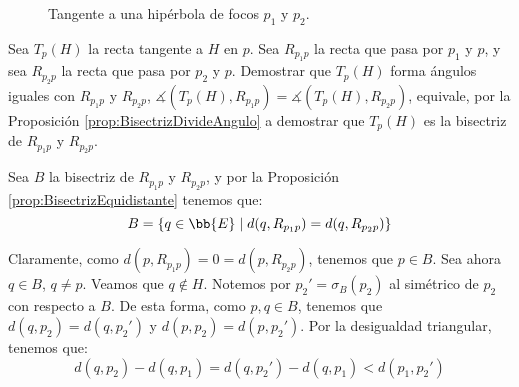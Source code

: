 \begin{ejercicio}
\begin{enumerate}
\begin{figure}[H]
        \caption{Tangente a una hipérbola de focos $p_1$ y $p_2$.}  
        \label{fig:ej5.3.7.TangenteHip}
    \end{figure}
    Sea $T_p(H)$ la recta tangente a $H$ en $p$. Sea $R_{p_1p}$ la recta que pasa por $p_1$ y $p$,
    y sea $R_{p_2p}$ la recta que pasa por $p_2$ y $p$. Demostrar que $T_p(H)$ forma ángulos iguales con $R_{p_1p}$ y $R_{p_2p}$,     
    $\measuredangle(T_p(H), R_{p_1p})=\measuredangle(T_p(H), R_{p_2p})$, equivale, por la Proposición \ref{prop:BisectrizDivideAngulo}
    a demostrar que $T_p(H)$ es la bisectriz de $R_{p_1p}$ y $R_{p_2p}$.

    Sea $B$ la bisectriz de $R_{p_1p}$ y $R_{p_2p}$, y por la Proposición \ref{prop:BisectrizEquidistante} tenemos que:
    \begin{equation*}
        B = \{q\in \bb{E} \mid d(q, R_{p_1p}) = d(q, R_{p_2p})\}
    \end{equation*}

    Claramente, como $d(p, R_{p_1p}) = 0 = d(p, R_{p_2p})$, tenemos que $p\in B$. Sea ahora $q\in B$, $q\neq p$. Veamos que
    $q \notin H$. Notemos por $p_2'=\sigma_{B}(p_2)$ al simétrico de $p_2$ con respecto a $B$.
    De esta forma, como $p,q\in B$, tenemos que $d(q, p_2) = d(q, p_2')$ y $d(p, p_2) = d(p, p_2')$.
    Por la desigualdad triangular, tenemos que:
    \begin{equation*}
          d(q, p_2)  - d(q, p_1)
        = d(q, p_2') - d(q, p_1)
        < d(p_1, p_2')
    \end{equation*}


\end{enumerate}
\end{ejercicio}
